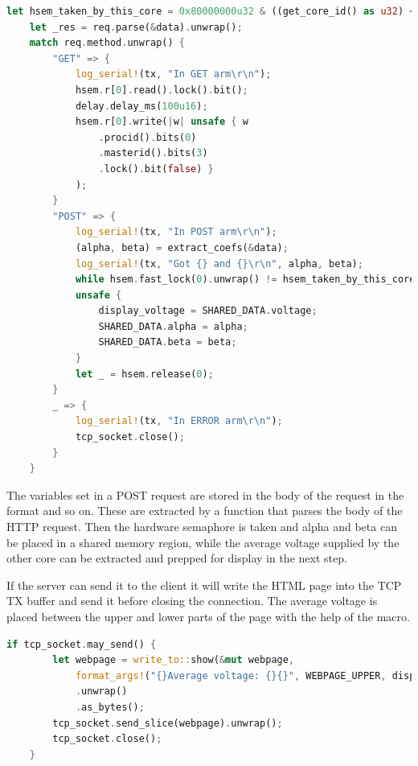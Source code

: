 \begin{lstlisting}[language=Rust,frame=single,float=!ht,style=customrust,label={lst:get-post},caption={Handling of GET and POST requests}]
    let hsem_taken_by_this_core = 0x80000000u32 & ((get_core_id() as u32) << 8);
    let _res = req.parse(&data).unwrap();
    match req.method.unwrap() {
        "GET" => {
            log_serial!(tx, "In GET arm\r\n");
            hsem.r[0].read().lock().bit();
            delay.delay_ms(100u16);
            hsem.r[0].write(|w| unsafe { w
                .procid().bits(0)
                .masterid().bits(3)
                .lock().bit(false) }
            );
        }
        "POST" => {
            log_serial!(tx, "In POST arm\r\n");
            (alpha, beta) = extract_coefs(&data);
            log_serial!(tx, "Got {} and {}\r\n", alpha, beta);
            while hsem.fast_lock(0).unwrap() != hsem_taken_by_this_core {}
            unsafe {
                display_voltage = SHARED_DATA.voltage;
                SHARED_DATA.alpha = alpha;
                SHARED_DATA.beta = beta;
            }
            let _ = hsem.release(0);
        }
        _ => {
            log_serial!(tx, "In ERROR arm\r\n");
            tcp_socket.close();
        }
    }
\end{lstlisting}

The variables set in a POST request are stored in the body of the request in the format  and so on. These are extracted by a function that parses the body of the HTTP request. Then the hardware semaphore is taken and alpha and beta can be placed in a shared memory region, while the average voltage supplied by the other core can be extracted and prepped for display in the next step.

If the server can send it to the client it will write the HTML page into the TCP TX buffer and send it before closing the connection. The average voltage is placed between the upper and lower parts of the page with the help of the  macro.

\begin{lstlisting}[language=Rust,frame=single,float=!ht,style=customrust,label={lst:may-send},caption={Sending a Response to the Client}]
    if tcp_socket.may_send() {
        let webpage = write_to::show(&mut webpage,
            format_args!("{}Average voltage: {}{}", WEBPAGE_UPPER, display_voltage, WEBPAGE_LOWER))
            .unwrap()
            .as_bytes();
        tcp_socket.send_slice(webpage).unwrap();
        tcp_socket.close();
    }
\end{lstlisting}


